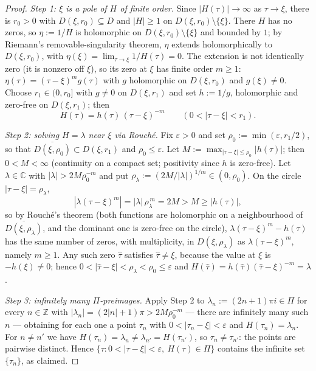 \documentclass[11pt]{article}
\theoremstyle{definition}
\theoremstyle{remark}
\theoremstyle{plain}
\newcommand{\C}{\mathbb{C}}
\newcommand{\Z}{\mathbb{Z}}
\begin{document}
\begin{proof}
\emph{Step 1: $\xi$ is a pole of $H$ of finite order.}  Since $|H(\tau)|\to\infty$ as
$\tau\to\xi$, there is $r_0>0$ with $D(\xi,r_0)\subseteq D$ and $|H|\ge1$ on
$D(\xi,r_0)\setminus\{\xi\}$.  There $H$ has no zeros, so $\eta:=1/H$ is holomorphic on
$D(\xi,r_0)\setminus\{\xi\}$ and bounded by $1$; by Riemann's removable-singularity
theorem, $\eta$ extends holomorphically to $D(\xi,r_0)$, with
$\eta(\xi)=\lim_{\tau\to\xi}1/H(\tau)=0$.  The extension is not identically zero (it is
nonzero off $\xi$), so its zero at $\xi$ has finite order $m\ge1$:
$\eta(\tau)=(\tau-\xi)^m g(\tau)$ with $g$ holomorphic on $D(\xi,r_0)$ and
$g(\xi)\neq0$.  Choose $r_1\in(0,r_0]$ with $g\neq0$ on $D(\xi,r_1)$ and set $h:=1/g$,
holomorphic and zero-free on $D(\xi,r_1)$; then
\[
H(\tau)=h(\tau)\,(\tau-\xi)^{-m}\qquad(0<|\tau-\xi|<r_1).
\]

\emph{Step 2: solving $H=\lambda$ near $\xi$ via Rouch\'e.}  Fix $\varepsilon>0$ and set
$\rho_0:=\min(\varepsilon,r_1/2)$, so that
$\overline{D(\xi,\rho_0)}\subset D(\xi,r_1)$ and $\rho_0\le\varepsilon$.  Let
$M:=\max_{|\tau-\xi|\le\rho_0}|h(\tau)|$; then $0<M<\infty$ (continuity on a compact set;
positivity since $h$ is zero-free).  Let $\lambda\in\C$ with $|\lambda|>2M\rho_0^{-m}$ and
put $\rho_\lambda:=(2M/|\lambda|)^{1/m}\in(0,\rho_0)$.  On the circle
$|\tau-\xi|=\rho_\lambda$,
\[
|\lambda(\tau-\xi)^m|=|\lambda|\,\rho_\lambda^{\,m}=2M>M\ge|h(\tau)|,
\]
so by Rouch\'e's theorem (both functions are holomorphic on a neighbourhood of
$\overline{D(\xi,\rho_\lambda)}$, and the dominant one is zero-free on the circle),
$\lambda(\tau-\xi)^m-h(\tau)$ has the same number of zeros, with multiplicity, in
$D(\xi,\rho_\lambda)$ as $\lambda(\tau-\xi)^m$, namely $m\ge1$.  Any such zero $\hat\tau$
satisfies $\hat\tau\neq\xi$, because the value at $\xi$ is $-h(\xi)\neq0$; hence
$0<|\hat\tau-\xi|<\rho_\lambda<\rho_0\le\varepsilon$ and
$H(\hat\tau)=h(\hat\tau)(\hat\tau-\xi)^{-m}=\lambda$.

\emph{Step 3: infinitely many $\Pi$-preimages.}  Apply Step 2 to
$\lambda_n:=(2n+1)\pi i\in\Pi$ for every $n\in\Z$ with
$|\lambda_n|=(2|n|+1)\pi>2M\rho_0^{-m}$ --- there are infinitely many such $n$ ---
obtaining for each one a point $\tau_n$ with $0<|\tau_n-\xi|<\varepsilon$ and
$H(\tau_n)=\lambda_n$.  For $n\neq n'$ we have
$H(\tau_n)=\lambda_n\neq\lambda_{n'}=H(\tau_{n'})$, so $\tau_n\neq\tau_{n'}$: the points
are pairwise distinct.  Hence
$\{\tau:0<|\tau-\xi|<\varepsilon,\ H(\tau)\in\Pi\}$ contains the infinite set
$\{\tau_n\}$, as claimed.
\end{proof}
\end{document}
